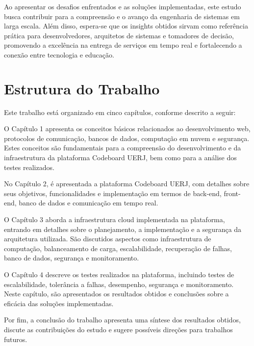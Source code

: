 Ao apresentar os desafios enfrentados e as soluções implementadas, este estudo busca contribuir para a compreensão e o avanço da engenharia de sistemas em larga escala. Além disso, espera-se que os insights obtidos sirvam como referência prática para desenvolvedores, arquitetos de sistemas e tomadores de decisão, promovendo a excelência na entrega de serviços em tempo real e fortalecendo a conexão entre tecnologia e educação.

\section*{Estrutura do Trabalho}

Este trabalho está organizado em cinco capítulos, conforme descrito a seguir:

O Capítulo 1 apresenta os conceitos básicos relacionados ao desenvolvimento web, protocolos de comunicação, bancos de dados, computação em nuvem e segurança. Estes conceitos são fundamentais para a compreensão do desenvolvimento e da infraestrutura da plataforma Codeboard UERJ, bem como para a análise dos testes realizados.

No Capítulo 2, é apresentada a plataforma Codeboard UERJ, com detalhes sobre seus objetivos, funcionalidades e implementação em termos de back-end, front-end, banco de dados e comunicação em tempo real.

O Capítulo 3 aborda a infraestrutura cloud implementada na plataforma, entrando em detalhes sobre o planejamento, a implementação e a segurança da arquitetura utilizada. São discutidos aspectos como infraestrutura de computação, balanceamento de carga, escalabilidade, recuperação de falhas, banco de dados, segurança e monitoramento.

O Capítulo 4 descreve os testes realizados na plataforma, incluindo testes de escalabilidade, tolerância a falhas, desempenho, segurança e monitoramento. Neste capítulo, são apresentados os resultados obtidos e conclusões sobre a eficácia das soluções implementadas.

Por fim, a conclusão do trabalho apresenta uma síntese dos resultados obtidos, discute as contribuições do estudo e sugere possíveis direções para trabalhos futuros.

